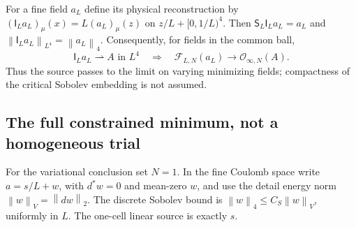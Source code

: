\documentclass[11pt,oneside,openany]{book}
\theoremstyle{definition}
\theoremstyle{remark}
\newcommand{\norm}[1]{\left\lVert#1\right\rVert}
\begin{document}
For a fine field $a_L$ define its physical reconstruction by
$(\mathsf I_La_L)_\mu(x)=L(a_L)_\mu(z)$ on
$z/L+[0,1/L)^4$. Then $\mathsf S_L\mathsf I_La_L=a_L$ and
$\norm{\mathsf I_La_L}_{L^4}=\norm{a_L}_4$. Consequently, for fields
in the common ball,
\begin{equation}
 \mathsf I_La_L\rightharpoonup A\text{ in }L^4
 \quad\Longrightarrow\quad
 \mathcal F_{L,N}(a_L)\longrightarrow\mathcal O_{\infty,N}(A).
 \label{eq:classical-varying-source}
\end{equation}
Thus the source passes to the limit on varying minimizing fields;
compactness of the critical Sobolev embedding is not assumed.

\subsection{The full constrained minimum, not a homogeneous trial}
For the variational conclusion set $N=1$. In the fine Coulomb space
write $a=s/L+w$, with $d^*w=0$ and mean-zero $w$, and use the
detail energy norm $\norm{w}_V=\norm{dw}_2$. The discrete Sobolev
bound is $\norm w_4\le C_S\norm{w}_V$, uniformly in $L$.
The one-cell linear source is exactly $s$.
\end{document}
